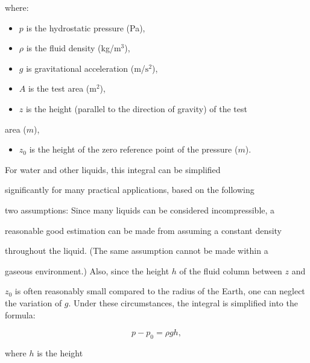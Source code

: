 where:


\begin{itemize}
    \item $p$ is the hydrostatic pressure (Pa),
\end{itemize}

\begin{itemize}
    \item $\rho$ is the fluid density (kg/$\text{m}^3$),
\end{itemize}

\begin{itemize}
    \item $g$ is gravitational acceleration (m/$\text{s}^2$),
\end{itemize}

\begin{itemize}
    \item $A$ is the test area ($\text{m}^2$),
\end{itemize}

\begin{itemize}
    \item $z$ is the height (parallel to the direction of gravity) of the test
\end{itemize}
    area ($m$),


\begin{itemize}
    \item $z_0$ is the height of the zero reference point of the pressure ($m$).
\end{itemize}

For water and other liquids, this integral can be simplified

significantly for many practical applications, based on the following

two assumptions: Since many liquids can be considered incompressible, a

reasonable good estimation can be made from assuming a constant density

throughout the liquid. (The same assumption cannot be made within a

gaseous environment.) Also, since the height $h$ of the fluid column between $z$ and

$z_0$ is often reasonably small compared to the radius of the Earth, one can neglect the variation of $g$. Under these circumstances, the integral is simplified into the formula:


\[
p - p_0 = \rho g h,
\]


where $h$ is the height

